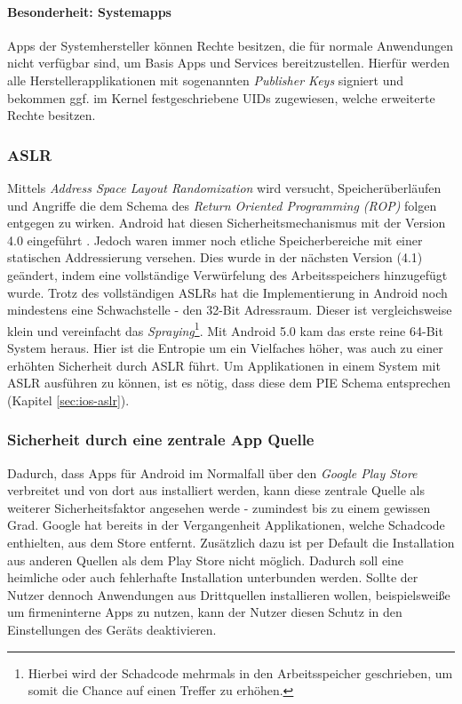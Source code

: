 	\paragraph{Besonderheit: Systemapps}
	Apps der Systemhersteller können Rechte besitzen, die für normale Anwendungen nicht verfügbar sind, um Basis Apps und Services bereitzustellen. Hierfür werden alle Herstellerapplikationen mit sogenannten \textit{Publisher Keys} signiert und bekommen ggf. im Kernel festgeschriebene UIDs zugewiesen, welche erweiterte Rechte besitzen.
	
	\subsubsection{ASLR}
	Mittels \textit{Address Space Layout Randomization} wird versucht, Speicherüberläufen und Angriffe die dem Schema des \textit{Return Oriented Programming (ROP)} folgen entgegen zu wirken. Android hat diesen Sicherheitsmechanismus mit der Version 4.0 eingeführt \cite{AslrAndroid}. Jedoch waren immer noch etliche Speicherbereiche mit einer statischen Addressierung versehen. Dies wurde in der nächsten Version (4.1) geändert, indem eine vollständige Verwürfelung des Arbeitsspeichers hinzugefügt wurde\cite{BetterAslrAndroid}. Trotz des vollständigen ASLRs hat die Implementierung in Android noch mindestens eine Schwachstelle - den 32-Bit Adressraum\cite{AslrAndroid32}. Dieser ist vergleichsweise klein und vereinfacht das \textit{Spraying}\footnote{Hierbei wird der Schadcode mehrmals in den Arbeitsspeicher geschrieben, um somit die Chance auf einen Treffer zu erhöhen.}. Mit Android 5.0 kam das erste reine 64-Bit System heraus. Hier ist die Entropie um ein Vielfaches höher, was auch zu einer erhöhten Sicherheit durch ASLR führt. Um Applikationen in einem System mit ASLR ausführen zu können, ist es nötig, dass diese dem PIE Schema entsprechen (Kapitel \ref{sec:ios-aslr}).
	
	
	\subsubsection{Sicherheit durch eine zentrale App Quelle}
	Dadurch, dass Apps für Android im Normalfall über den \textit{Google Play Store} verbreitet und von dort aus installiert werden, kann diese zentrale Quelle als weiterer Sicherheitsfaktor angesehen werde - zumindest bis zu einem gewissen Grad. Google hat bereits in der Vergangenheit Applikationen, welche Schadcode enthielten, aus dem Store entfernt. Zusätzlich dazu ist per Default die Installation aus anderen Quellen als dem Play Store nicht möglich. Dadurch soll eine heimliche oder auch fehlerhafte Installation unterbunden werden. Sollte der Nutzer dennoch Anwendungen aus Drittquellen installieren wollen, beispielsweiße um firmeninterne Apps zu nutzen, kann der Nutzer diesen Schutz in den Einstellungen des Geräts deaktivieren.
